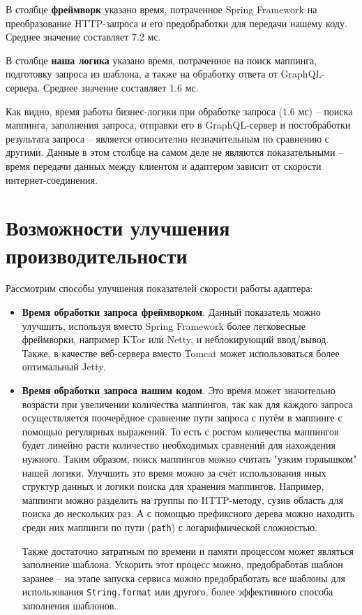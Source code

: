В столбце \textbf{фреймворк} указано время, потраченное Spring Framework на преобразование HTTP-запроса и его предобработки для передачи нашему коду.
Среднее значение составляет $7.2$ мс.

В столбце \textbf{наша логика} указано время, потраченное на поиск маппинга, подготовку запроса из шаблона, а также на обработку ответа от GraphQL-сервера.
Среднее значение составляет $1.6$ мс.

Как видно, время работы бизнес-логики при обработке запроса ($1.6$ мс) -- поиска маппинга, заполнения запроса, отправки его в GraphQL-сервер и постобработки результата запроса -- является относително незначительным по сравнению с другими.
Данные в этом столбце на самом деле не являются показательными -- время передачи данных между клиентом и адаптером зависит от скорости интернет-соединения.


\section{Возможности улучшения производительности} \label{sec:ch4-performance-improve}

Рассмотрим способы улучшения показателей скорости работы адаптера:

\begin{itemize}
	\item \textbf{Время обработки запроса фреймворком}.
		Данный показатель можно улучшить, используя вместо Spring Framework более легковесные фреймворки, например KTor или Netty, и неблокирующий ввод/вывод.
		Также, в качестве веб-сервера вместо Tomcat может использоваться более оптимальный Jetty.

	\item \textbf{Время обработки запроса нашим кодом}.
		Это время может значительно возрасти при увеличении количества маппингов, так как для каждого запроса осуществляется поочерёдное сравнение пути запроса с путём в маппинге с помощью регулярных выражений.
То есть с ростом количества маппингов будет линейно расти количество необходимых сравнений для нахождения нужного.
Таким образом, поиск маппингов можно считать "узким горлышком" нашей логики.
Улучшить это время можно за счёт использования иных структур данных и логики поиска для хранения маппингов.
Например, маппинги можно разделить на группы по HTTP-методу, сузив область для поиска до нескольких раз.
А с помощью префиксного дерева можно находить среди них маппинги по пути (\texttt{path}) с логарифмической сложностью.

	Также достаточно затратным по времени и памяти процессом может являться заполнение шаблона.
	Ускорить этот процесс можно, предобработав шаблон заранее -- на этапе запуска сервиса можно предобработать все шаблоны для использования \texttt{String.format} или другого, более эффективного способа заполнения шаблонов.
\end{itemize}

